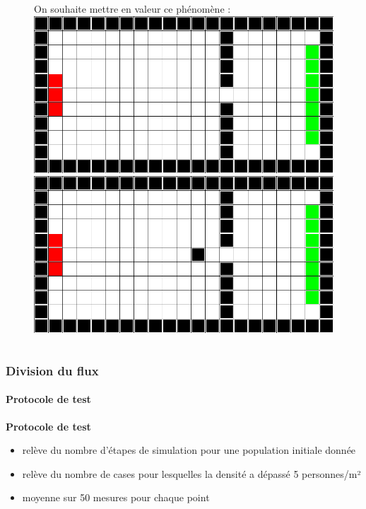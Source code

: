 \begin{frame}
\begin{columns}
{\begin{column}{0.475\textwidth}
                \begin{figure}
                    On souhaite mettre en valeur ce phénomène : \\[.2cm]
                    \includegraphics[width=.6 \textwidth]{figures/Fig09} \\[.3cm]
                    \includegraphics[width=.6\textwidth]{figures/Fig08}
                \end{figure}
            \end{column}
        }
    \end{columns}
\end{frame}


\begin{frame}
    \frametitle{Division du flux}
    \framesubtitle{Protocole de test}
    \textbf{Protocole de test}
    \begin{itemize}
        \item <2-> relève du nombre d'étapes de simulation pour une population initiale donnée
        \item <3-> relève du nombre de cases pour lesquelles la densité a dépassé 5 personnes/m²
        \item <4-> moyenne sur 50 mesures pour chaque point
    \end{itemize}
\end{frame}



